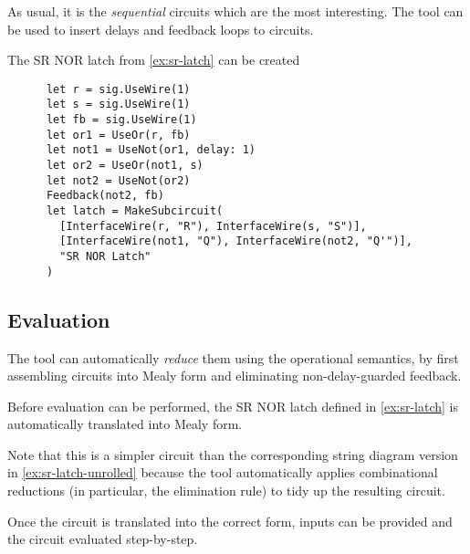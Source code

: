 As usual, it is the \emph{sequential} circuits which are the most interesting.
The tool can be used to insert delays and feedback loops to circuits.

\begin{example}\label{ex:sr-latch-hdl}
  The SR NOR latch from \cref{ex:sr-latch} can be created
  \begin{lstlisting}
      let r = sig.UseWire(1)
      let s = sig.UseWire(1)
      let fb = sig.UseWire(1)
      let or1 = UseOr(r, fb)
      let not1 = UseNot(or1, delay: 1)
      let or2 = UseOr(not1, s)
      let not2 = UseNot(or2)
      Feedback(not2, fb)
      let latch = MakeSubcircuit(
        [InterfaceWire(r, "R"), InterfaceWire(s, "S")],
        [InterfaceWire(not1, "Q"), InterfaceWire(not2, "Q'")],
        "SR NOR Latch"
      )
    \end{lstlisting}
  \begin{center}
    \scalebox{0.3}{}
  \end{center}
\end{example}

\subsection{Evaluation}

The tool can automatically \emph{reduce} them using the operational semantics,
by first assembling circuits into Mealy form and eliminating non-delay-guarded
feedback.

\begin{example}\label{ex:sr-latch-evaluator}
  Before evaluation can be performed, the SR NOR latch defined in
  \cref{ex:sr-latch} is automatically translated into Mealy form.
  \begin{center}
    \scalebox{0.25}{}
  \end{center}
  Note that this is a simpler circuit than the corresponding string diagram
  version in \cref{ex:sr-latch-unrolled} because the tool automatically
  applies combinational reductions (in particular, the elimination rule) to
  tidy up the resulting circuit.
\end{example}

Once the circuit is translated into the correct form, inputs can be provided
and the circuit evaluated step-by-step.

